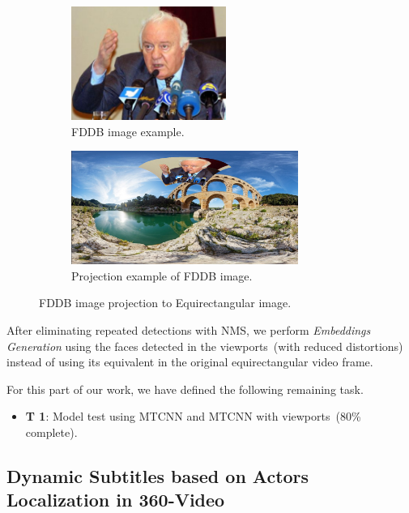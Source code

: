 \begin{figure}[!ht]
\centering
    \begin{subfigure}{0.4\linewidth}
        \centering
        \includegraphics[height=10em]{img/face_pre.png}
        \caption{FDDB image example.}
        \label{subfig:face_pre}
    \end{subfigure}\hfill
    \begin{subfigure}{0.55\linewidth}
        \centering
        \includegraphics[height=10em]{img/face_pos.png}
        \caption{Projection example of FDDB image.}
        \label{subfig:face_pos}
    \end{subfigure}

\caption{FDDB image projection to Equirectangular image.}
\label{fig:fddb_proj}
\end{figure}

After eliminating repeated detections with NMS, we perform \emph{Embeddings Generation} using the faces detected in the viewports~(with reduced distortions) instead of using its equivalent in the original equirectangular video frame.

For this part of our work, we have defined the following remaining task.

\begin{itemize}
    \item \textbf{T 1}: Model test using MTCNN and MTCNN with viewports~(80\% complete).
\end{itemize}

\subsection{Dynamic Subtitles based on Actors Localization in 360-Video}
\label{subsec:dynamic_subtitles}


